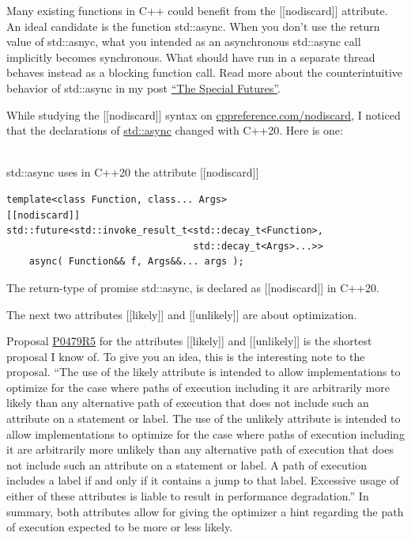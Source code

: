 \begin{tcolorbox}[breakable,enhanced jigsaw,colback=red!5!white,colframe=red!75!black,title={The issue with std::async}]
Many existing functions in C++ could benefit from the [[nodiscard]] attribute. An ideal candidate is the function std::async. When you don’t use the return value of std::asnyc, what you intended as an asynchronous std::async call implicitly becomes synchronous. What should have run in a separate thread behaves instead as a blocking function call. Read more about the counterintuitive behavior of std::async in my post \href{https://www.modernescpp.com/index.php/the-special-futures}{“The Special Futures”}.

While studying the [[nodiscard]] syntax on \href{https://en.cppreference.com/w/cpp/language/attributes/nodiscard}{cppreference.com/nodiscard}, I noticed that the declarations of \href{https://en.cppreference.com/w/cpp/thread/async}{std::async} changed with C++20. Here is one:

\hspace*{\fill} \\ %
\noindent
std::async uses in C++20 the attribute [[nodiscard]]
\begin{lstlisting}[style=styleCXX]
template<class Function, class... Args>
[[nodiscard]]
std::future<std::invoke_result_t<std::decay_t<Function>,
								 std::decay_t<Args>...>>
	async( Function&& f, Args&&... args );
\end{lstlisting}

The return-type of promise std::async, is declared as [[nodiscard]] in C++20.
	
\end{tcolorbox}

The next two attributes [[likely]] and [[unlikely]] are about optimization.


Proposal \href{http://www.open-std.org/jtc1/sc22/wg21/docs/papers/2018/p0479r5.html}{P0479R5} for the attributes [[likely]] and [[unlikely]] is the shortest proposal I know of. To give you an idea, this is the interesting note to the proposal. “The use of the likely attribute is intended to allow implementations to optimize for the case where paths of execution including it are arbitrarily more likely than any alternative path of execution that does not include such an attribute on a statement or label. The use of the unlikely attribute is intended to allow implementations to optimize for the case where paths of execution including it are arbitrarily more unlikely than any alternative path of execution that does not include such an attribute on a statement or label. A path of execution includes a label if and only if it contains a jump to that label. Excessive usage of either of these attributes is liable to result in performance degradation.” In summary, both attributes allow for giving the optimizer a hint regarding the path of execution expected to be more or less likely.

